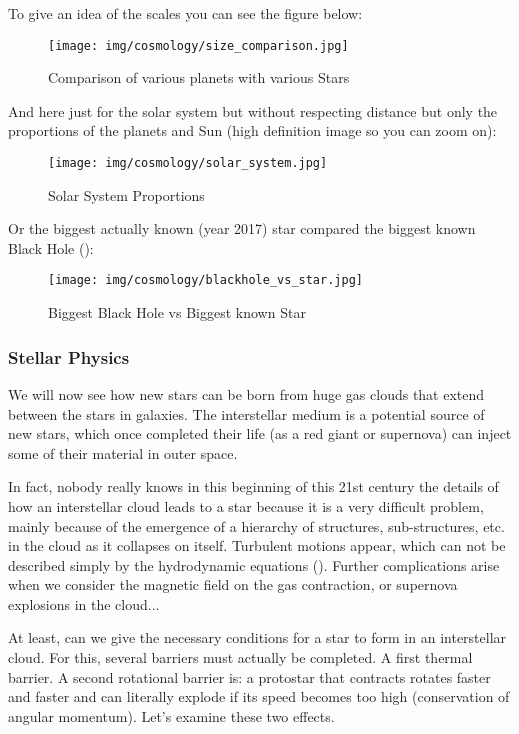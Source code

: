 	To give an idea of the scales you can see the figure below:
	\begin{figure}[H]
		\centering
		\texttt{[image: img/cosmology/size\_comparison.jpg]}
		\caption{Comparison of various planets with various Stars}
	\end{figure}
	And here just for the solar system but without respecting distance but only the proportions of the planets and Sun (high definition image so you can zoom on):
	\begin{figure}[H]
		\centering
		\texttt{[image: img/cosmology/solar\_system.jpg]}
		\caption{Solar System Proportions}
	\end{figure}
	Or the biggest actually known (year 2017) star compared the biggest known Black Hole ():
	\begin{figure}[H]
		\centering
		\texttt{[image: img/cosmology/blackhole\_vs\_star.jpg]}	
		\caption{Biggest Black Hole vs Biggest known Star}
	\end{figure} 
	
	\pagebreak
	\subsubsection{Stellar Physics}
	We will now see how new stars can be born from huge gas clouds that extend between the stars in galaxies. The interstellar medium is a potential source of new stars, which once completed their life (as a red giant or supernova) can inject some of their material in outer space.

	In fact, nobody really knows in this beginning of this 21st century the details of how an interstellar cloud leads to a star because it is a very difficult problem, mainly because of the emergence of a hierarchy of structures, sub-structures, etc. in the cloud as it collapses on itself. Turbulent motions appear, which can not be described simply by the hydrodynamic equations (). Further complications arise when we consider the magnetic field on the gas contraction, or supernova explosions in the cloud...

	At least, can we give the necessary conditions for a star to form in an interstellar cloud. For this, several barriers must actually be completed. A first thermal barrier. A second rotational barrier is: a protostar that contracts rotates faster and faster and can literally explode if its speed becomes too high (conservation of angular momentum). Let's examine these two effects.
	
